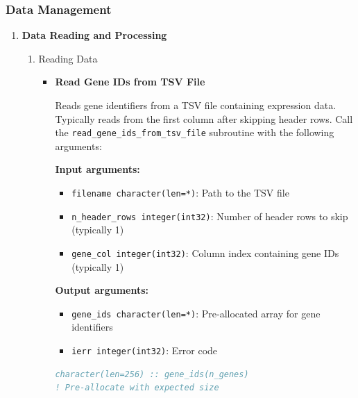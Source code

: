 \subsubsection{Data Management}
\begin{enumerate}
    \item \textbf{Data Reading and Processing} \\
          \begin{enumerate}
            \item Reading Data
                  \begin{itemize}
                    \item \textbf{Read Gene IDs from TSV File}
                          
                          Reads gene identifiers from a TSV file containing expression data.
                          Typically reads from the first column after skipping header rows. Call
                          the \texttt{read\_gene\_ids\_from\_tsv\_file} subroutine with the
                          following arguments:
                          
                          \textbf{Input arguments:}
                          \begin{itemize}
                            \item \texttt{filename character(len=*)}: Path to the TSV file
                                  
                            \item \texttt{n\_header\_rows integer(int32)}: Number of header rows
                                  to skip (typically 1)
                                  
                            \item \texttt{gene\_col integer(int32)}: Column index containing
                                  gene IDs (typically 1)
                          \end{itemize}
                          \textbf{Output arguments:}
                          \begin{itemize}
                            \item \texttt{gene\_ids character(len=*)}: Pre-allocated array for
                                  gene identifiers
                                  
                            \item \texttt{ierr integer(int32)}: Error code
                          \end{itemize}
                          \begin{lstlisting}[language=Fortran, caption={Read Gene IDs from TSV File}]
character(len=256) :: gene_ids(n_genes)  
! Pre-allocate with expected size


\end{lstlisting}
\end{itemize}
\end{enumerate}
\end{enumerate}
